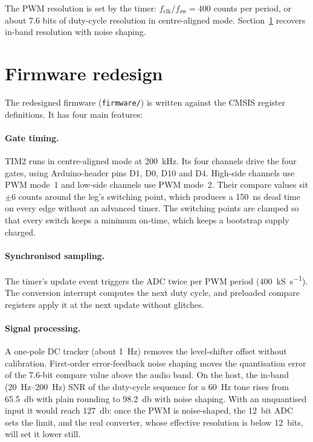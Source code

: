 \documentclass[10pt,a4paper]{article}
\begin{document}
The PWM resolution is set by the timer: $f_\mathrm{clk}/f_\mathrm{sw}=400$ counts per period, or about \num{7.6} bits of duty-cycle resolution in centre-aligned mode. Section~\ref{sec:fw} recovers in-band resolution with noise shaping.

\section{Firmware redesign}\label{sec:fw}
The redesigned firmware (\texttt{firmware/}) is written against the CMSIS register definitions. It has four main features:

\paragraph{Gate timing.} TIM2 runs in centre-aligned mode at \SI{200}{\kilo\hertz}. Its four channels drive the four gates, using Arduino-header pins D1, D0, D10 and D4. High-side channels use PWM mode~1 and low-side channels use PWM mode~2. Their compare values sit $\pm6$ counts around the leg's switching point, which produces a \SI{150}{\nano\second} dead time on every edge without an advanced timer. The switching points are clamped so that every switch keeps a minimum on-time, which keeps a bootstrap supply charged.

\paragraph{Synchronised sampling.} The timer's update event triggers the ADC twice per PWM period (\SI{400}{\kilo S\per\second}). The conversion interrupt computes the next duty cycle, and preloaded compare registers apply it at the next update without glitches.

\paragraph{Signal processing.} A one-pole DC tracker (about \SI{1}{\hertz}) removes the level-shifter offset without calibration. First-order error-feedback noise shaping moves the quantisation error of the 7.6-bit compare value above the audio band. On the host, the in-band (\SIrange{20}{200}{\hertz}) SNR of the duty-cycle sequence for a \SI{60}{\hertz} tone rises from \SI{65.5}{\decibel} with plain rounding to \SI{98.2}{\decibel} with noise shaping. With an unquantised input it would reach \SI{127}{\decibel}: once the PWM is noise-shaped, the \SI{12}{bit} ADC sets the limit, and the real converter, whose effective resolution is below \SI{12}{bits}, will set it lower still.
\end{document}
